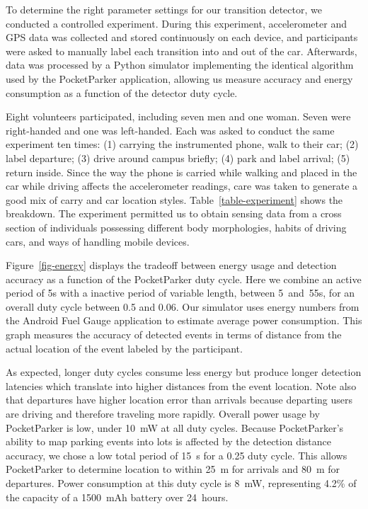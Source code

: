 

To determine the right parameter settings for our transition detector, we
conducted a controlled experiment. During this experiment, accelerometer and
GPS data was collected and stored continuously on each device, and
participants were asked to manually label each transition into and out of the
car. Afterwards, data was processed by a Python simulator implementing the
identical algorithm used by the PocketParker application, allowing us measure
accuracy and energy consumption as a function of the detector duty cycle.

Eight volunteers participated, including seven men and one woman. Seven were
right-handed and one was left-handed. Each was asked to conduct the same
experiment ten times: (1) carrying the instrumented phone, walk to their car;
(2) label departure; (3) drive around campus briefly; (4) park and label
arrival; (5) return inside. Since the way the phone is carried while walking
and placed in the car while driving affects the accelerometer readings, care
was taken to generate a good mix of carry and car location styles.
Table~\ref{table-experiment} shows the breakdown. The experiment permitted us
to obtain sensing data from a cross section of individuals possessing
different body morphologies, habits of driving cars, and ways of handling
mobile devices.

Figure~\ref{fig-energy} displays the tradeoff between energy usage and
detection accuracy as a function of the PocketParker duty cycle. Here we
combine an active period of 5s with a inactive period of variable length,
between 5~and~55s, for an overall duty cycle between 0.5 and 0.06. Our
simulator uses energy numbers from the Android Fuel Gauge application
to estimate average power consumption.  This graph measures the accuracy of
detected events in terms of distance from the actual location of the event
labeled by the participant.

As expected, longer duty cycles consume less energy but produce longer
detection latencies which translate into higher distances from the event
location. Note also that departures have higher location error than arrivals
because departing users are driving and therefore traveling more rapidly.
Overall power usage by PocketParker is low, under 10~mW at all duty cycles.
Because PocketParker's ability to map parking events into lots is affected by
the detection distance accuracy, we chose a low total period of 15~s for a
0.25 duty cycle. This allows PocketParker to determine location to within
25~m for arrivals and 80~m for departures. Power consumption at this duty
cycle is 8~mW, representing 4.2\% of the capacity of a 1500~mAh battery over
24~hours.

